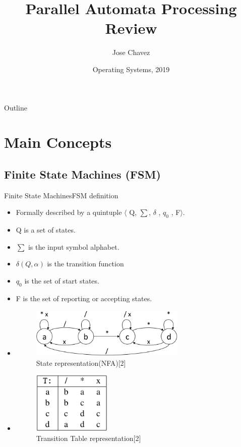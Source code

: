 \documentclass{beamer}
\title{Parallel Automata Processing Review}
\author{Jose Chavez\inst{.}}
\institute[University of Engeeniering and Technology] %
{
  \inst{.}%
  Department of Computer Science\\
  University of Engeeniering and Technology
  }
\date{Operating Systems, 2019}
\begin{document}
\begin{frame}
  \titlepage
\end{frame}

\begin{frame}{Outline}
  \tableofcontents
\end{frame}

\section{Main Concepts}

\subsection{Finite State Machines (FSM)}

\begin{frame}[allowframebreaks]{Finite State Machines}{FSM definition}
\begin{itemize}
    \item Formally described by a quintuple $\langle$ Q, $\sum$, $\delta$ , $q_0$ , F$\rangle$.
    
        \item Q is a set of states.
        \item $\sum$  is the input symbol alphabet.
        \item $\delta(Q,\alpha)$ is the transition function
        \item $q_0$ is the set of start states.
        \item F is the set of reporting or accepting states.  
            
     
            \item   \begin{figure}[!h]
                \includegraphics[width=0.7\textwidth]{fsmestado.png}
                \caption{State representation(NFA)[2]}
                \end{figure}
        \item   \begin{figure}[!h]
            \includegraphics[width=0.35\textwidth]{fsmmatrix.png}
            \caption{Transition Table representation[2]}
            \end{figure}
    
                
    \end{itemize}
    
\end{frame}
\end{document}
